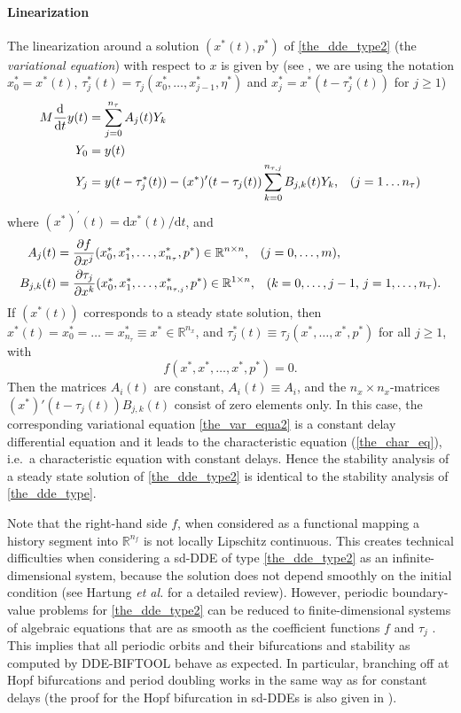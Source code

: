 \documentclass[10pt]{scrartcl}
\newcommand{\DDEBIFCODE}{\textsc{DDE-BIFTOOL}}
\newcommand{\define}[1]{\emph{#1}}
\renewcommand{\d}{\mathrm{d}}
\newcommand{\RR}{\mathbb{R}}
\begin{document}
\paragraph{Linearization}
The linearization around a solution $(x^*(t),p^*)$ of
\eqref{the_dde_type2} (the \define{variational equation}) with respect
to $x$ is given by (see \cite{HKWW06}, we are using the notation
$x^*_0=x^*(t)$, $\tau_j^*(t)=\tau_j(x^*_0,\ldots,x^*_{j-1},\eta^*)$ and
$x^*_j=x^*(t-\tau^*_j(t))$ for $j\geq1$)
\begin{equation}\label{the_var_equa2}
\begin{aligned}
M\frac{\d}{\d t}{y(t)}&=\sum_{j=0}^{n_\tau}A_j(t)Y_k \\
Y_0&=y(t)\\
Y_j&=y(t-\tau^*_j(t))-(x^*)'(t-\tau_j(t))\sum_{k=0}^{n_{\tau,j}}B_{j,k}(t)Y_k\mbox{,\quad($j=1\ldots n_\tau$)}
\end{aligned}
\end{equation}
where $(x^*)^{'}(t)={\d}x^*(t)/{\d}t$, and
\begin{equation}\label{A_def2}
\begin{aligned}
  A_j(t)&=\frac{\partial f}{\partial x^j}(x^*_0,x^*_1,\ldots,x^*_{n_\tau},p^*)\in\RR^{n\times n}
  \mbox{,\quad ($j=0,\ldots,m$),}\\
  B_{j,k}(t)&=\frac{\partial \tau_j}{\partial x^k}(x^*_0,x^*_1,\ldots,x^*_{n_{\tau,j}},p^*)\in\RR^{1\times n}\mbox{,\quad ($k=0,\ldots,j-1$, $j=1,\ldots,n_\tau$).} 
\end{aligned}
\end{equation}
If $(x^*(t))$ corresponds to a steady state solution, then
$x^*(t)=x^*_0=\ldots=x^*_{n_\tau}\equiv x^*\in\RR^{n_x}$, and
$\tau^*_j(t)\equiv \tau_j(x^*,\ldots,x^*,p^*)$ for all $j\geq1$,
with
\[
f(x^*,x^*,\ldots,x^*,p^*)=0\mbox{.}
\]
Then the matrices $A_i(t)$ are constant, $A_i(t)\equiv A_i$, and the
$n_x\times n_x$-matrices $(x^*)'(t-\tau_j(t))B_{j,k}(t)$ consist of zero elements only.  In this case, the
corresponding variational equation \eqref{the_var_equa2} is a constant
delay differential equation and it leads to the characteristic
equation (\ref{the_char_eq}), i.e.~a characteristic equation with
constant delays. Hence the stability analysis of a steady state
solution of \eqref{the_dde_type2} is identical to the stability analysis
of \eqref{the_dde_type}.

Note that the right-hand side $f$, when considered as a functional
mapping a history segment into $\RR^{n_f}$ is not locally Lipschitz
continuous. This creates technical difficulties when considering a
sd-DDE of type \eqref{the_dde_type2} as an infinite-dimensional
system, because the solution does not depend smoothly on the
initial condition (see Hartung \emph{et al. }\cite{HKWW06} for a
detailed review). However, periodic boundary-value problems for
\eqref{the_dde_type2} can be reduced to finite-dimensional systems of
algebraic equations that are as smooth as the coefficient functions
$f$ and $\tau_j$ \cite{S12}. This implies that all periodic orbits and
their bifurcations and stability as computed by \DDEBIFCODE{} behave as
expected. In particular, branching off at Hopf bifurcations and period
doubling works in the same way as for constant delays (the proof for the Hopf
bifurcation in sd-DDEs is also given in \cite{S12}).
\end{document}

